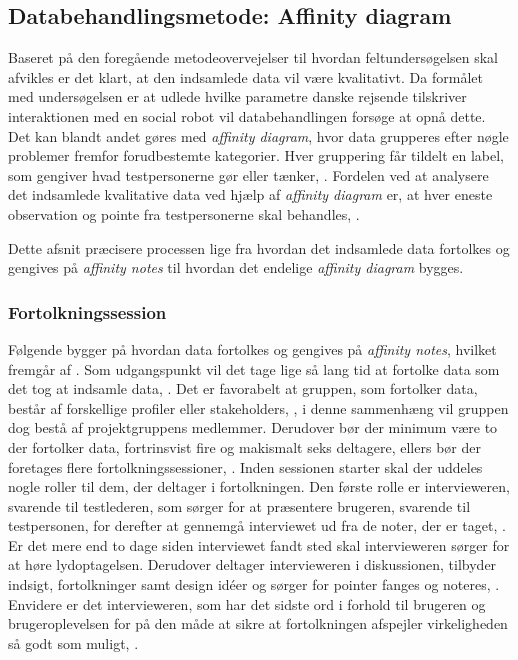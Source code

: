 \subsection{Databehandlingsmetode: Affinity diagram}
\label{ParametreMetodeovervejelserAffinityDiagram}
%
Baseret på den foregående metodeovervejelser til hvordan feltundersøgelsen skal afvikles er det klart, at den indsamlede data vil være kvalitativt. Da formålet med undersøgelsen er at udlede hvilke parametre danske rejsende tilskriver interaktionen med en social robot vil databehandlingen forsøge at opnå dette. Det kan blandt andet gøres med \textit{affinity diagram}, hvor data grupperes efter nøgle problemer fremfor forudbestemte kategorier. Hver gruppering får tildelt en label, som gengiver hvad testpersonerne gør eller tænker, \parencite[s. 159]{Book:BuildingAnAffinity}. Fordelen ved at analysere det indsamlede kvalitative data ved hjælp af \textit{affinity diagram} er, at hver eneste observation og pointe fra testpersonerne skal behandles, \parencite[s. 25]{PDF:ConsolidationIdeationAffinity}.

Dette afsnit præcisere processen lige fra hvordan det indsamlede data fortolkes og gengives på \textit{affinity notes} til hvordan det endelige \textit{affinity diagram} bygges.

\subsubsection{Fortolkningssession}
\label{ParametreFortolkningssession}
%
Følgende bygger på hvordan data fortolkes og gengives på \textit{affinity notes}, hvilket fremgår af \textcite[ss. 101-122]{Book:CIInterpretationSession}. Som udgangspunkt vil det tage lige så lang tid at fortolke data som det tog at indsamle data, \parencite[s. 102]{Book:CIInterpretationSession}. Det er favorabelt at gruppen, som fortolker data, består af forskellige profiler eller stakeholders, \parencite[s. 104]{Book:CIInterpretationSession}, i denne sammenhæng vil gruppen dog bestå af projektgruppens medlemmer. Derudover bør der minimum være to der fortolker data, fortrinsvist fire og makismalt seks deltagere, ellers bør der foretages flere fortolkningssessioner, \parencite[s. 104]{Book:CIInterpretationSession}. \blankline
%
Inden sessionen starter skal der uddeles nogle roller til dem, der deltager i fortolkningen. Den første rolle er intervieweren, svarende til testlederen, som sørger for at præsentere brugeren, svarende til testpersonen, for derefter at gennemgå interviewet ud fra de noter, der er taget, \parencite[ss. 106-107]{Book:CIInterpretationSession}. Er det mere end to dage siden interviewet fandt sted skal intervieweren sørger for at høre lydoptagelsen. Derudover deltager intervieweren i diskussionen, tilbyder indsigt, fortolkninger samt design idéer og sørger for pointer fanges og noteres, \parencite[s. 107]{Book:CIInterpretationSession}. Envidere er det intervieweren, som har det sidste ord i forhold til brugeren og brugeroplevelsen for på den måde at sikre at fortolkningen afspejler virkeligheden så godt som muligt, \parencite[s. 107]{Book:CIInterpretationSession}.

